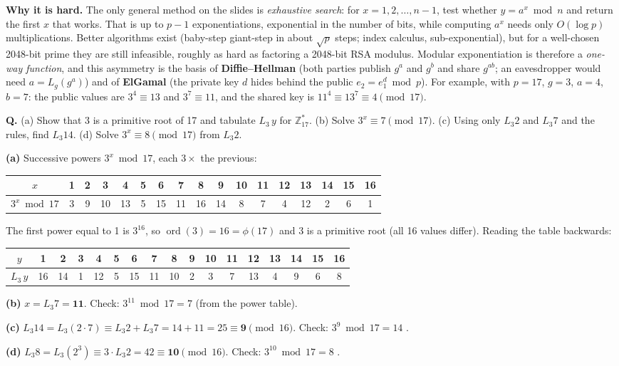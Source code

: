 \textbf{Why it is hard.} The only general method on the slides is \emph{exhaustive search}: for $x = 1, 2, \dots, n - 1$, test whether $y = a^x \bmod n$ and return the first $x$ that works. That is up to $p - 1$ exponentiations, exponential in the number of bits, while computing $a^x$ needs only $O(\log p)$ multiplications. Better algorithms exist (baby-step giant-step in about $\sqrt p$ steps; index calculus, sub-exponential), but for a well-chosen 2048-bit prime they are still infeasible, roughly as hard as factoring a 2048-bit RSA modulus. Modular exponentiation is therefore a \emph{one-way function}, and this asymmetry is the basis of \textbf{Diffie--Hellman} (both parties publish $g^a$ and $g^b$ and share $g^{ab}$; an eavesdropper would need $a = L_g(g^a)$) and of \textbf{ElGamal} (the private key $d$ hides behind the public $e_2 = e_1^d \bmod p$). For example, with $p = 17$, $g = 3$, $a = 4$, $b = 7$: the public values are $3^4 \equiv 13$ and $3^7 \equiv 11$, and the shared key is $11^4 \equiv 13^7 \equiv 4 \pmod{17}$.

\begin{worked}
\textbf{Q.} (a) Show that 3 is a primitive root of 17 and tabulate $L_3\, y$ for $\mathbb{Z}_{17}^*$. (b) Solve $3^x \equiv 7 \pmod{17}$. (c) Using only $L_3 2$ and $L_3 7$ and the rules, find $L_3 14$. (d) Solve $3^x \equiv 8 \pmod{17}$ from $L_3 2$.

\textbf{(a)} Successive powers $3^x \bmod 17$, each $3 \times$ the previous:
\begin{center}\small
\setlength{\tabcolsep}{3.5pt}
\begin{tabular}{@{}c|cccccccccccccccc@{}}
$x$ & 1&2&3&4&5&6&7&8&9&10&11&12&13&14&15&16\\ \midrule
$3^x \bmod 17$ & 3&9&10&13&5&15&11&16&14&8&7&4&12&2&6&1\\
\end{tabular}
\end{center}
The first power equal to 1 is $3^{16}$, so $\operatorname{ord}(3) = 16 = \phi(17)$ and 3 is a primitive root (all 16 values differ). Reading the table backwards:
\begin{center}\small
\setlength{\tabcolsep}{3.5pt}
\begin{tabular}{@{}c|cccccccccccccccc@{}}
$y$ & 1&2&3&4&5&6&7&8&9&10&11&12&13&14&15&16\\ \midrule
$L_3\, y$ & 16&14&1&12&5&15&11&10&2&3&7&13&4&9&6&8\\
\end{tabular}
\end{center}
\textbf{(b)} $x = L_3 7 = \mathbf{11}$. Check: $3^{11} \bmod 17 = 7$ (from the power table).

\textbf{(c)} $L_3 14 = L_3(2 \cdot 7) \equiv L_3 2 + L_3 7 = 14 + 11 = 25 \equiv \mathbf{9} \pmod{16}$. Check: $3^9 \bmod 17 = 14$ \checkmark.

\textbf{(d)} $L_3 8 = L_3(2^3) \equiv 3 \cdot L_3 2 = 42 \equiv \mathbf{10} \pmod{16}$. Check: $3^{10} \bmod 17 = 8$ \checkmark.
\end{worked}

